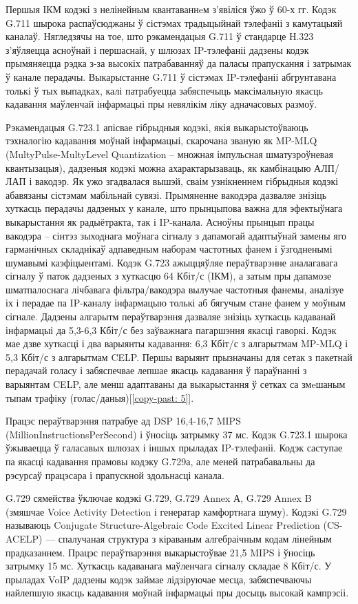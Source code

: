 Першыя ІКМ кодэкі з нелінейным квантаваннeм з'явіліся ўжо ў 60-х гг. Кодэк G.711 шырока распаўсюджаны ў сістэмах традыцыйнай тэлефаніі з камутацыяй каналаў. Нягледзячы на тое, што рэкамендацыя G.711 ў стандарце Н.323 з'яўляецца асноўнай і першаснай, у шлюзах IP-тэлефаніі дадзены кодэк прымяняецца рэдка з-за высокіх патрабаванняў да паласы прапускання і затрымак ў канале перадачы. Выкарыстанне G.711 ў сістэмах IP-тэлефаніі абгрунтавана толькі ў тых выпадках, калі патрабуецца забяспечыць максімальную якасць кадавання маўленчай інфармацыі пры невялікім ліку адначасовых размоў.

Рэкамендацыя G.723.1 апісвае гібрыдныя кодэкі, якія выкарыстоўваюць тэхналогію кадавання моўнай інфармацыі, скарочана званую як MP-MLQ (MultyPulse-MultyLevel Quan\-ti\-za\-tion -- множная імпульсная шматузроўневая квантызацыя), дадзеныя кодэкі можна ахарактарызаваць, як камбінацыю АЛП/ЛАП і вакодэр. Як ужо згадвалася вышэй, сваім узнікненнем гібрыдныя кодэкі абавязаны сістэмам мабільнай сувязі. Прымяненне вакодэра дазваляе знізіць хуткасць перадачы дадзеных у канале, што прынцыпова важна для эфектыўнага выкарыстання як радыётракта, так і IP-канала. Асноўны прынцып працы вакодэра -- сінтэз зыходнага моўнага сігналу з дапамогай адаптыўнай замены яго гарманічных складнікаў адпаведным наборам частотных фанем і ўзгодненымі шумавымі каэфіцыентамі. Кодэк G.723 ажыццяўляе пераўтварэнне аналагавага сігналу ў паток дадзеных з хуткасцю 64 Кбіт/с (ІКМ), а затым пры дапамозе шматпалоснага лічбавага фільтра/вакодэра вылучае частотныя фанемы, аналізуе іх і перадае па IP-каналу інфармацыю толькі аб бягучым стане фанем у моўным сігнале. Дадзены алгарытм пераўтварэння дазваляе знізіць хуткасць кадаванай інфармацыі да 5,3-6,3 Кбіт/с без заўважнага пагаршэння якасці гаворкі. Кодэк мае дзве хуткасці і два варыянты кадавання: 6,3 Кбіт/с з алгарытмам MP-MLQ і 5,3 Кбіт/с з алгарытмам CELP. Першы варыянт прызначаны для сетак з пакетнай перадачай голасу і забяспечвае лепшае якасць кадавання ў параўнанні з варыянтам CELP, але менш адаптаваны да выкарыстання ў сетках са змeшаным тыпам трафіку (голас/даныя)[\ref{copy-past: 5}].

Працэс пераўтварэння патрабуе ад DSP 16,4-16,7 MIPS (MillionInstructionsPerSecond) і ўносіць затрымку 37 мс. Кодэк G.723.1 шырока ўжываецца ў галасавых шлюзах і іншых прыладах IP-тэлефаніі. Кодэк саступае па якасці кадавання прамовы кодэку G.729а, але меней патрабавальны да рэсурсаў працэсара і прапускной здольнасці канала.

G.729 сямейства ўключае кодэкі G.729, G.729 Annex А, G.729 Annex B (змяшчае Voice Activity Detection і генератар камфортнага шуму). Кодэкі G.729 называюць Conjugate Structure-Algebraic Code Excited Linear Prediction (CS-ACELP) --- спалучаная структура з кіраваным алгебраічным кодам лінейным прадказаннем. Працэс пераўтварэння выкарыстоўвае 21,5 MIPS і ўносіць затрымку 15 мс. Хуткасць кадаванага маўленчага сігналу складае 8 Кбіт/с. У прыладах VoIP дадзены кодэк займае лідзіруючае месца, забяспечваючы найлепшую якасць кадавання моўнай інфармацыі пры досыць высокай кампрэсіі.

